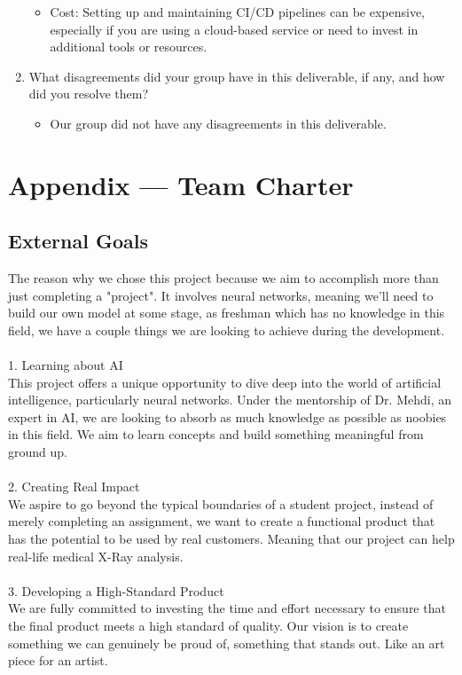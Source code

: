 \documentclass{article}
\begin{document}
\begin{enumerate}
\begin{itemize}
        \item Cost: Setting up and maintaining CI/CD pipelines can be expensive, especially if you are using a cloud-based service or need to invest in additional tools or resources.
        \end{itemize}
    \item What disagreements did your group have in this deliverable, if any,
    and how did you resolve them?
    \begin{itemize}
        \item Our group did not have any disagreements in this deliverable.
    \end{itemize}
\end{enumerate}

\newpage{}

\section*{Appendix --- Team Charter}

\subsection*{External Goals}
The reason why we chose this project because we aim to accomplish more than just completing a "project". It involves neural networks, meaning we'll need to build our own model at some stage, as freshman which has no knowledge in this field, we have a couple things we are looking to achieve during the development. \\\\
1. Learning about AI \\
This project offers a unique opportunity to dive deep into the world of artificial intelligence, particularly neural networks. Under the mentorship of Dr. Mehdi, an expert in AI, we are looking to absorb as much knowledge as possible as noobies in this field. We aim to learn concepts and build something meaningful from ground up.\\\\
2. Creating Real Impact \\
We aspire to go beyond the typical boundaries of a student project, instead of merely completing an assignment, we want to create a functional product that has the potential to be used by real customers. Meaning that our project can help real-life medical X-Ray analysis. \\\\
3. Developing a High-Standard Product \\
We are fully committed to investing the time and effort necessary to ensure that the final product meets a high standard of quality. Our vision is to create something we can genuinely be proud of, something that stands out. Like an art piece for an artist.
\end{document}

